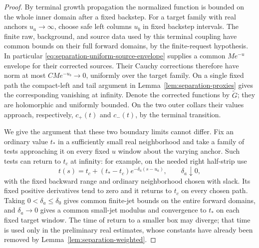 \begin{proof}
By terminal growth propagation the normalized function is
bounded on the whole inner domain after a fixed backstep.
For a target family with real anchors $u_a\to\infty$, choose
safe left columns $u_b$ in fixed backstep intervals.  The finite
raw, background, and source data used by this terminal coupling
have common bounds on their full forward domains, by the
finite-request hypothesis.  In particular
\eqref{eq:separation-uniform-source-envelope} supplies a common
$M e^{-u}$ envelope for their corrected sources.  Their Cauchy
corrections therefore have norm at most $CM e^{-u_b}\to0$,
uniformly over the target family.  On a single fixed path the
compact-left and tail argument in
Lemma~\ref{lem:separation-proxies} gives the corresponding
vanishing at infinity.  Denote the corrected functions by $\widetilde G$; they are
holomorphic and uniformly bounded.
On the two outer collars their values approach, respectively,
$c_+(t)$ and $c_-(t)$, by the terminal transition.

We give the argument that these two boundary limits cannot
differ.  Fix an ordinary value $t_*$ in a sufficiently small
real neighborhood and take a family of tests approaching it
on every fixed $u$ window about the varying anchor.  Such tests
can return to $t_c$ at infinity: for example, on the needed
right half-strip use
\[
 t(s)=t_c+(t_*-t_c)e^{-\delta_a(s-u_a)},
 \qquad\delta_a\downarrow0,
\]
with the fixed backward range and ordinary neighborhood chosen
with slack.  Its fixed positive derivatives tend to zero and
it returns to $t_c$ on every chosen path.  Taking
$0<\delta_a\leq\delta_0$ gives common finite-jet bounds on
the entire forward domains, and $\delta_a\to0$ gives a
common small-jet modulus and convergence to $t_*$ on each
fixed target window.  The time of return to a smaller box may
diverge; that time is used only in the preliminary real
estimates, whose constants have already been removed by
Lemma~\ref{lem:separation-weighted}.


\end{proof}

